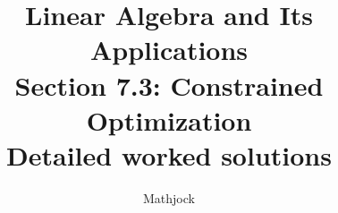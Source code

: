 
\title{\textbf{Linear Algebra and Its Applications}\\[0.3em]Section 7.3: Constrained Optimization\\[0.3em]\large Detailed worked solutions}
\author{Mathjock}
\date{}

\maketitle
\bookinfo
\tableofcontents
\clearpage
\renewcommand{\thesection}{7.\arabic{section}}
\renewcommand{\theHsection}{7.\arabic{section}}
\setcounter{section}{2}


